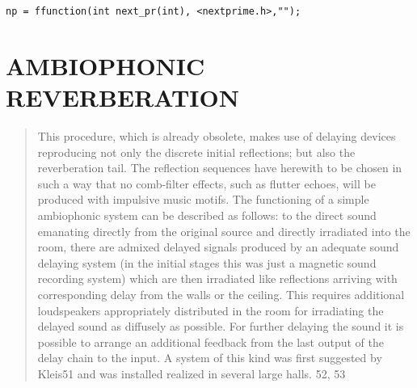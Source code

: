 \begin{lstlisting}
np = ffunction(int next_pr(int), <nextprime.h>,"");
\end{lstlisting}

\section*{AMBIOPHONIC REVERBERATION}

\begin{quote}
  This procedure, which is already obsolete, makes use of delaying devices
  reproducing not only the discrete initial reflections; but also the
  reverberation tail. The reflection sequences have herewith to be chosen in
  such a way that no comb-filter effects, such as flutter echoes, will be
  produced with impulsive music motifs. The functioning of a simple ambiophonic
  system can be described as follows: to the direct sound emanating directly
  from the original source and directly irradiated into the room, there are
  admixed delayed signals produced by an adequate sound delaying system (in the
  initial stages this was just a magnetic sound recording system) which are
  then irradiated like reflections arriving with corresponding delay from the
  walls or the ceiling. This requires additional loudspeakers appropriately
  distributed in the room for irradiating the delayed sound as diffusely as
  possible. For further delaying the sound it is possible to arrange an additional
  feedback from the last output of the delay chain to the input. A system of this
  kind was first suggested by Kleis51 and was installed realized in several large
  halls. 52, 53 \cite{gb:08}
\end{quote}

